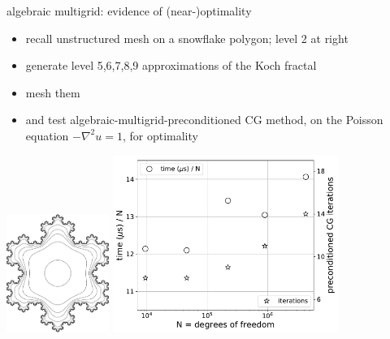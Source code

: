 \documentclass[hide notes,intlimits,usenames,dvipsnames]{beamer}
\newcommand{\grad}{\nabla}
\begin{document}
\begin{frame}{algebraic multigrid: evidence of (near-)optimality}
\begin{itemize}
\item \begin{minipage}[t]{65mm}
recall unstructured mesh on a snowflake polygon; level 2 at right
\end{minipage} \quad \begin{minipage}[t]{20mm}
\begin{tikzpicture}[scale=0.7,baseline]  \end{tikzpicture}
\end{minipage}
\item generate level 5,6,7,8,9 approximations of the Koch fractal
\item mesh them
\item and test algebraic-multigrid-preconditioned CG method, on the Poisson equation $-\grad^2 u = 1$, for optimality
\end{itemize}

\begin{center}
\includegraphics[width=0.25\textwidth]{figs/snowflake} \qquad \includegraphics[width=0.55\textwidth]{figs/gamgopt}
\end{center}
\end{frame}
\end{document}
